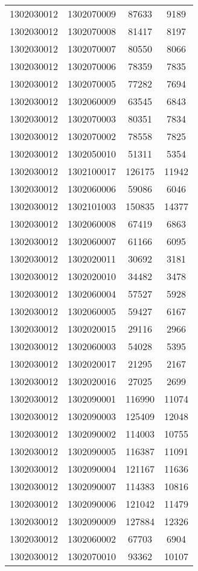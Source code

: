 \begin{longtable}[h]{llcc}
		1302030012 & 1302070009 & 87633 & 9189\\
		1302030012 & 1302070008 & 81417 & 8197\\
		1302030012 & 1302070007 & 80550 & 8066\\
		1302030012 & 1302070006 & 78359 & 7835\\
		1302030012 & 1302070005 & 77282 & 7694\\
		1302030012 & 1302060009 & 63545 & 6843\\
		1302030012 & 1302070003 & 80351 & 7834\\
		1302030012 & 1302070002 & 78558 & 7825\\
		1302030012 & 1302050010 & 51311 & 5354\\
		1302030012 & 1302100017 & 126175 & 11942\\
		1302030012 & 1302060006 & 59086 & 6046\\
		1302030012 & 1302101003 & 150835 & 14377\\
		1302030012 & 1302060008 & 67419 & 6863\\
		1302030012 & 1302060007 & 61166 & 6095\\
		1302030012 & 1302020011 & 30692 & 3181\\
		1302030012 & 1302020010 & 34482 & 3478\\
		1302030012 & 1302060004 & 57527 & 5928\\
		1302030012 & 1302060005 & 59427 & 6167\\
		1302030012 & 1302020015 & 29116 & 2966\\
		1302030012 & 1302060003 & 54028 & 5395\\
		1302030012 & 1302020017 & 21295 & 2167\\
		1302030012 & 1302020016 & 27025 & 2699\\
		1302030012 & 1302090001 & 116990 & 11074\\
		1302030012 & 1302090003 & 125409 & 12048\\
		1302030012 & 1302090002 & 114003 & 10755\\
		1302030012 & 1302090005 & 116387 & 11091\\
		1302030012 & 1302090004 & 121167 & 11636\\
		1302030012 & 1302090007 & 114383 & 10816\\
		1302030012 & 1302090006 & 121042 & 11479\\
		1302030012 & 1302090009 & 127884 & 12326\\
		1302030012 & 1302060002 & 67703 & 6904\\
		1302030012 & 1302070010 & 93362 & 10107\\

\end{longtable}
